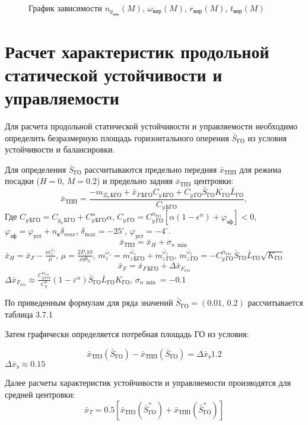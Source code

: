 \begin{figure}[H]
\centering
\resizebox{.79\linewidth}{!}{}
\caption{График зависимости $n_{y_{вир}}(M)$, $\omega_{вир}(M)$, $r_{вир}(M)$, $t_{вир}(M)$}
\label{fig:turn}
\end{figure}


\section{Расчет характеристик продольной статической устойчивости и
управляемости}

Для расчета продольной статической устойчивости и управляемости
необходимо определить безразмерную площадь горизонтального оперения
$\bar{S}_{ГО}$ из условия устойчивости и
балансировки.

Для определения $\bar{S}_{ГО}$ рассчитываются
предельно передняя $\bar{x}_{ТПП}$ для режима
посадки ($H=0,\, M=0.2$) и предельно задняя
$\bar{x}_{ТПЗ}$ центровки:
\[
    \bar{x}_{ТПП} = \frac{-m_{Z_0\, БГО} + \bar{x}_{F\, БГО}C_{y\, БГО}+ 
    C_{y\, ГО} \bar{S}_{ГО} K_{ГО} \bar{L}_{ГО}}{C_{y\, БГО}},
\]
Где $C_{y \, БГО} = C_{y_0\,{БГО}} + C_{y\, БГО}^\alpha \alpha$, 
$C_{y\, ГО} = C_{y\, ГО}^{\alpha_{ГО}} \left[ \alpha(1-\epsilon^\alpha) + 
\varphi_{эф}\right] < 0$, $\varphi_{эф} = \varphi_{уст} + n_в \delta_{max}$,
$\delta_{\max} = -25^\circ$, $\varphi_{уст} = -4^\circ$. 
\[
    \bar{x}_{ТПЗ} = \bar{x}_{H} + \sigma_{n\, \min}
\]
$\bar{x}_{H} = \bar{x}_F - \frac{m_z^{\bar{\omega}_z}}{\mu}$, $\mu = \frac{2 P_s 10 }{\rho g b_a}$,
$m_z^{\bar{\omega}_z} = m_{z\, БГО}^{\bar{\omega}_z}+m_{z\, ГО}^{\bar{\omega}_z}$,
$m_{z\, ГО}^{\bar{\omega}_z} = - C_{y\, {ГО}}^{\alpha_{ГО}} \bar{S}_{ГО} \bar{L}_{ГО}
\sqrt{K_{ГО}}$
\[
    \bar{x}_F = \bar{x}_{F\, БГО} + \Delta \bar{x}_{F_{ГО}}
\]
$ \Delta \bar{x}_{F_{ГО}} \approx \frac{C_{y\, ГО}^{\alpha_{ГО}} }{C_{y}^\alpha}
(1-\varepsilon^\alpha)\bar{S}_{ГО} \bar{L}_{ГО}
K_{ГО}$, $\sigma_{n\, \min} = -0.1$

По приведенным формулам для ряда значений
$\bar{S}_{ГО} = (0.01,\, 0.2)$ рассчитывается таблица
3.7.1

Затем графически определяется потребная площадь ГО из условия:

\[
    \bar{x}_{ТПЗ}(\bar{S}_{ГО}) - \bar{x}_{ТПП}(\bar{S}_{ГО}) = \Delta \bar{x}_{э} 1.2 
\]
$\Delta \bar{x}_{э} \approx 0.15$


Далее расчеты характеристик устойчивости и управляемости производятся
для средней центровки: 
\[
    \bar{x}_{T} = 0.5 \left[  \bar{x}_{ТПЗ}(\bar{S}_{ГО}^*) + \bar{x}_{ТПП}(\bar{S}_{ГО}^*) \right] 
\]

